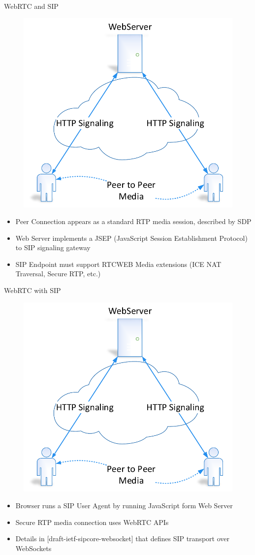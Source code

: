 \begin{frame}{WebRTC and SIP}
\begin{figure}
\includegraphics[page=5,width=.5\textwidth]{image/webrtc.pdf}
\end{figure}
\begin{footnotesize}
\begin{itemize}
\item Peer Connection appears as a standard RTP media session, described by SDP
\item Web Server implements a JSEP (JavaScript Session Establishment Protocol) to SIP signaling gateway
\item SIP Endpoint must support RTCWEB Media extensions (ICE NAT Traversal, Secure RTP, etc.)
\end{itemize}
\end{footnotesize}
\end{frame}

\begin{frame}{WebRTC with SIP}
\begin{figure}
\includegraphics[page=6,width=.6\textwidth]{image/webrtc.pdf}
\end{figure}
\begin{itemize}
\item Browser runs a SIP User Agent by running JavaScript form Web Server
\item Secure RTP media connection uses WebRTC APIs
\item Details in [draft-ietf-sipcore-websocket] that defines SIP transport over WebSockets
\end{itemize}
\end{frame}

